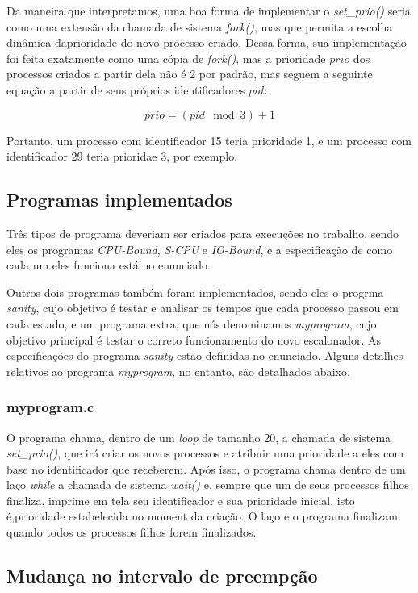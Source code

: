 \documentclass{article}
\begin{document}
Da maneira que interpretamos, uma boa forma de implementar o
\textit{set\_prio()} seria como uma extensão da chamada de sistema
\textit{fork()}, mas que permita a escolha dinâmica daprioridade do novo
processo criado. Dessa forma, sua implementação foi feita exatamente como uma
cópia de \textit{fork()}, mas a prioridade \(prio\) dos processos criados a
partir dela
não é 2 por padrão, mas seguem a seguinte equação a partir de seus próprios
identificadores \(pid\):

\[prio = (pid \mod 3) + 1\]

Portanto, um processo com identificador 15 teria prioridade 1, e um processo
com identificador 29 teria prioridae 3, por exemplo.

\subsection{Programas implementados}

Três tipos de programa deveriam ser criados para execuções no trabalho, sendo
eles
os programas \textit{CPU-Bound}, \textit{S-CPU} e \textit{IO-Bound}, e a
especificação de como cada um eles funciona está no enunciado.

Outros dois programas também foram implementados, sendo eles o progrma
\textit{sanity}, cujo objetivo é testar e analisar os tempos que cada processo
passou em cada estado, e um programa extra, que nós denominamos
\textit{myprogram}, cujo objetivo principal é testar o correto funcionamento do
novo escalonador. As especificações do programa \textit{sanity} estão definidas
no enunciado. Alguns detalhes relativos ao programa
\textit{myprogram}, no entanto, são detalhados abaixo.

\subsubsection{myprogram.c}

O programa chama, dentro de um \textit{loop} de tamanho 20, a chamada de
sistema \textit{set\_prio()}, que irá criar os novos processos e atribuir uma
prioridade a eles com base no identificador que receberem.
Após isso, o programa chama dentro de um laço \textit{while} a chamada de
sistema \textit{wait()} e, sempre que um de seus processos filhos finaliza,
imprime em tela seu identificador e sua prioridade inicial, isto é,prioridade
estabelecida no moment da criação.
O laço e o programa finalizam quando todos os processos filhos forem
finalizados.

\subsection{Mudança no intervalo de preempção}
\end{document}

